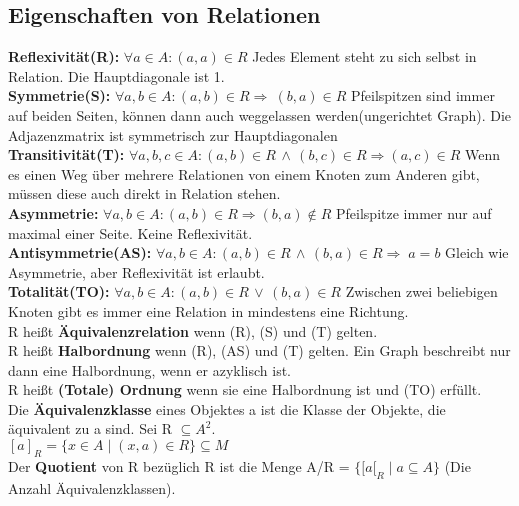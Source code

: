 \documentclass[11pt]{article}
\begin{document}
\subsection{Eigenschaften von Relationen}
{\bfseries Reflexivit{\"a}t(R):} $\forall a \in A\colon (a,a) \in R$ Jedes Element steht zu sich selbst in Relation. Die Hauptdiagonale ist 1. \\
{\bfseries Symmetrie(S):} $\forall a,b \in A\colon (a,b) \in R \Rightarrow\ (b,a) \in R$ Pfeilspitzen sind immer auf beiden Seiten, k{\"o}nnen dann auch weggelassen werden(ungerichtet Graph). Die Adjazenzmatrix ist symmetrisch zur Hauptdiagonalen\\
{\bfseries Transitivit{\"a}t(T):} $\forall a,b,c \in A\colon (a,b) \in R \,\land\, (b,c) \in R \Rightarrow (a,c) \in R$ Wenn es einen Weg {\"u}ber mehrere Relationen von einem Knoten zum Anderen gibt, m{\"u}ssen diese auch direkt in Relation stehen. \\
{\bfseries Asymmetrie:} $\forall a,b \in A\colon (a,b) \in R \Rightarrow (b,a) \notin R$ Pfeilspitze immer nur auf maximal einer Seite. Keine Reflexivit{\"a}t. \\
{\bfseries Antisymmetrie(AS):} $\forall a,b \in A\colon (a,b) \in R \,\land\, (b,a) \in R \Rightarrow\; a = b$ Gleich wie Asymmetrie, aber Reflexivit{\"a}t ist erlaubt. \\
{\bfseries Totalit{\"a}t(TO):} $\forall a,b \in A\colon (a,b) \in R \,\lor\, (b,a) \in R$ Zwischen zwei beliebigen Knoten gibt es immer eine Relation in mindestens eine Richtung.\\
R hei{\ss}t {\bfseries {\"A}quivalenzrelation} wenn (R), (S) und (T) gelten. \\
R hei{\ss}t {\bfseries Halbordnung} wenn (R), (AS) und (T) gelten. Ein Graph beschreibt nur dann eine Halbordnung, wenn er azyklisch ist. \\
R hei{\ss}t {\bfseries (Totale) Ordnung} wenn sie eine Halbordnung ist und (TO) erf{\"u}llt. \\
Die {\bfseries {\"A}quivalenzklasse} eines Objektes a ist die Klasse der Objekte, die {\"a}quivalent zu a sind. Sei R $\subseteq A^2$. \\$[a]_R = \{x\in A\mid (x,a) \in R\} \subseteq M$\\
Der {\bfseries Quotient} von R bez{\"u}glich R ist die Menge A/R = $\{{[}a{[}_R\mid a\subseteq A\}$ (Die Anzahl {\"A}quivalenzklassen).
\end{document}
